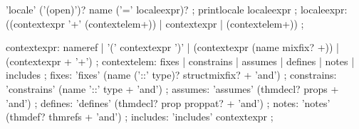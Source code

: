 
\begin{rail}
  'locale' ('(open)')? name ('=' localeexpr)?
  ;
  printlocale localeexpr
  ;
  localeexpr: ((contextexpr '+' (contextelem+)) | contextexpr | (contextelem+))
  ;

  contextexpr: nameref | '(' contextexpr ')' |
  (contextexpr (name mixfix? +)) | (contextexpr + '+')
  ;
  contextelem: fixes | constrains | assumes | defines | notes | includes
  ;
  fixes: 'fixes' (name ('::' type)? structmixfix? + 'and')
  ;
  constrains: 'constrains' (name '::' type + 'and')
  ;
  assumes: 'assumes' (thmdecl? props + 'and')
  ;
  defines: 'defines' (thmdecl? prop proppat? + 'and')
  ;
  notes: 'notes' (thmdef? thmrefs + 'and')
  ;
  includes: 'includes' contextexpr
  ;
\end{rail}

